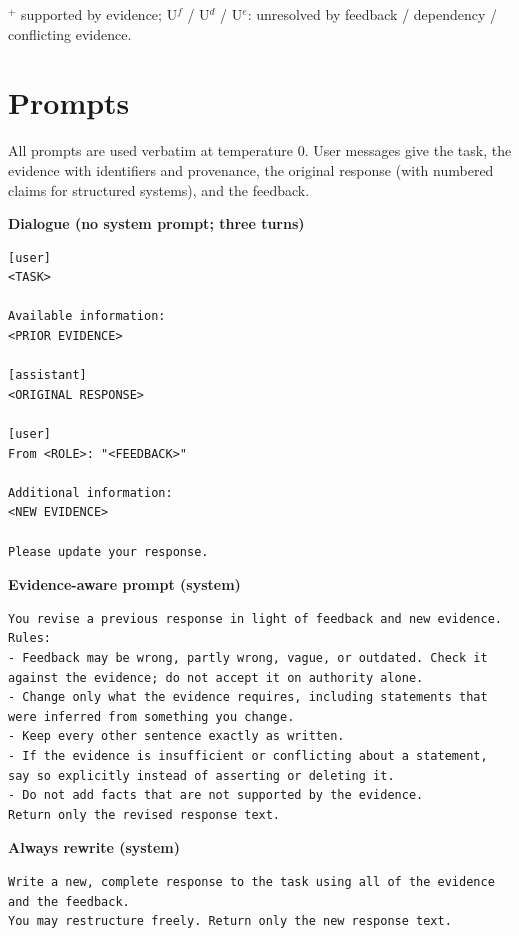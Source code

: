 $^{+}$ supported by evidence; U$^{f}$ / U$^{d}$ / U$^{e}$: unresolved by feedback / dependency / conflicting evidence.

\section{Prompts}

All prompts are used verbatim at temperature 0. User messages give the task, the evidence with identifiers and provenance, the original response (with numbered claims for structured systems), and the feedback.

\medskip\noindent\textbf{Dialogue (no system prompt; three turns)}\nopagebreak
\begin{lstlisting}
[user]
<TASK>

Available information:
<PRIOR EVIDENCE>

[assistant]
<ORIGINAL RESPONSE>

[user]
From <ROLE>: "<FEEDBACK>"

Additional information:
<NEW EVIDENCE>

Please update your response.
\end{lstlisting}

\medskip\noindent\textbf{Evidence-aware prompt (system)}\nopagebreak
\begin{lstlisting}
You revise a previous response in light of feedback and new evidence.
Rules:
- Feedback may be wrong, partly wrong, vague, or outdated. Check it against the evidence; do not accept it on authority alone.
- Change only what the evidence requires, including statements that were inferred from something you change.
- Keep every other sentence exactly as written.
- If the evidence is insufficient or conflicting about a statement, say so explicitly instead of asserting or deleting it.
- Do not add facts that are not supported by the evidence.
Return only the revised response text.
\end{lstlisting}

\medskip\noindent\textbf{Always rewrite (system)}\nopagebreak
\begin{lstlisting}
Write a new, complete response to the task using all of the evidence and the feedback.
You may restructure freely. Return only the new response text.
\end{lstlisting}

